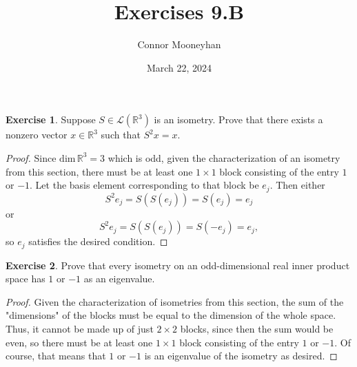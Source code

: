 \documentclass{article}
\title{Exercises 9.B}
\author{Connor Mooneyhan}
\date{March 22, 2024}
\theoremstyle{definition}
\newtheorem{ex}{Exercise}
\begin{document}
\maketitle

\begin{ex}
	Suppose $S \in \mathcal{L}(\mathbb{R}^3)$ is an isometry. Prove that there exists a nonzero vector $x \in \mathbb{R}^3$ such that $S^2x = x$.
\end{ex}
\begin{proof}
	Since $\mathrm{dim}\,\mathbb{R}^3 = 3$ which is odd, given the characterization of an isometry from this section, there must be at least one $1\times1$ block consisting of the entry $1$ or $-1$.
	Let the basis element corresponding to that block be $e_j$.
	Then either \begin{equation*}
		S^2e_j = S(S(e_j)) = S(e_j) = e_j
	\end{equation*} or \begin{equation*}
		S^2e_j = S(S(e_j)) = S(-e_j) = e_j,
	\end{equation*} so $e_j$ satisfies the desired condition.
\end{proof}

\begin{ex}
	Prove that every isometry on an odd-dimensional real inner product space has $1$ or $-1$ as an eigenvalue.
\end{ex}
\begin{proof}
	Given the characterization of isometries from this section, the sum of the "dimensions" of the blocks must be equal to the dimension of the whole space.
	Thus, it cannot be made up of just $2\times2$ blocks, since then the sum would be even, so there must be at least one $1\times1$ block consisting of the entry $1$ or $-1$.
	Of course, that means that $1$ or $-1$ is an eigenvalue of the isometry as desired.
\end{proof}
\end{document}
